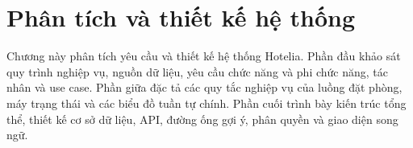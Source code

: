 \chapter{Phân tích và thiết kế hệ thống}\label{chap:design}

Chương này phân tích yêu cầu và thiết kế hệ thống Hotelia. Phần đầu khảo sát quy trình nghiệp vụ, nguồn dữ liệu, yêu cầu chức năng và phi chức năng, tác nhân và use case. Phần giữa đặc tả các quy tắc nghiệp vụ của luồng đặt phòng, máy trạng thái và các biểu đồ tuần tự chính. Phần cuối trình bày kiến trúc tổng thể, thiết kế cơ sở dữ liệu, API, đường ống gợi ý, phân quyền và giao diện song ngữ.




